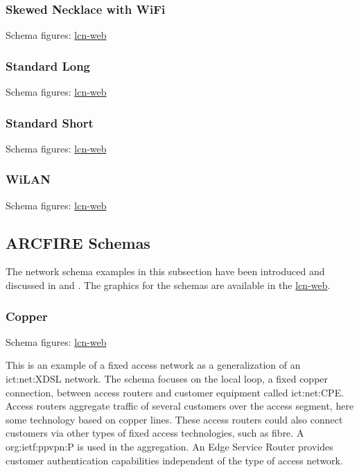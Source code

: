 \subsubsection{Skewed Necklace with WiFi}
\label{sec:examples:rina:sn-wifi}
Schema figures: \href{https://vdmeer.github.io/skb/ipc/lcn-examples/rina/rina-sn-wifi/index.html}{lcn-web}


\subsubsection{Standard Long}
\label{sec:examples:rina:std-long}
Schema figures: \href{https://vdmeer.github.io/skb/ipc/lcn-examples/rina/rina-std-long/index.html}{lcn-web}


\subsubsection{Standard Short}
\label{sec:examples:rina:std-short}
Schema figures: \href{https://vdmeer.github.io/skb/ipc/lcn-examples/rina/rina-std-short/index.html}{lcn-web}


\subsubsection{WiLAN}
\label{sec:examples:rina:wilan}
Schema figures: \href{https://vdmeer.github.io/skb/ipc/lcn-examples/rina/rina-wilan/index.html}{lcn-web}




\subsection{ARCFIRE Schemas}

The network schema examples in this subsection have been introduced and discussed in \cite{d22arcfire} and \cite{d44arcfire}.
The graphics for the schemas are available in the \href{https://vdmeer.github.io/skb/ipc/lcn-examples/arcfire/arcfire.html}{lcn-web}.



\subsubsection{Copper}
\label{sec:examples:af-d22:copper}
Schema figures: \href{https://vdmeer.github.io/skb/ipc/lcn-examples/arcfire/af-d22-copper/index.html}{lcn-web}

This is an example of a fixed access network as a generalization of an \acs{ict:net:XDSL} network.
The schema focuses on the local loop, a fixed copper connection, between access routers and customer equipment called \acs{ict:net:CPE}.
Access routers aggregate traffic of several customers over the access segment, here some technology based on copper lines.
These access routers could also connect customers via other types of fixed access technologies, such as fibre.
A \ac{org:ietf:ppvpn:P} is used in the aggregation.
An Edge Service Router provides customer authentication capabilities independent of the type of access network.



